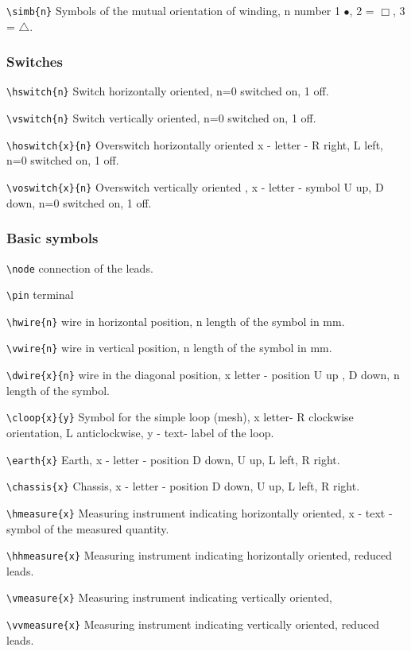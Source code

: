 \noindent
\verb?\simb{n}?
Symbols of the mutual orientation of winding,
n number 1 $\bullet$, 2 = $\Box$, 3 =
$\triangle $.


\subsubsection{Switches}
\verb?\hswitch{n}?
Switch horizontally oriented, n=0 switched on, 1 off.

\noindent
\verb?\vswitch{n}?
Switch vertically oriented, n=0 switched on, 1 off.


\noindent
\verb?\hoswitch{x}{n}?
Overswitch horizontally oriented x - letter - R right,
L left, n=0 switched on, 1 off.

\noindent
\verb?\voswitch{x}{n}?
Overswitch vertically oriented , x - letter - symbol U up,
D down, n=0 switched on, 1 off.

\subsubsection{Basic symbols}
\verb?\node?
connection of the leads.

\noindent
\verb?\pin?
terminal

\noindent
\verb?\hwire{n}?
wire in horizontal position, n length of the symbol in mm.


\noindent
\verb?\vwire{n}?
wire in vertical position, n length of the symbol in mm.

\noindent
\verb?\dwire{x}{n}?
wire in the diagonal position, x letter - position U up , D
down, n  length of the symbol.

\noindent
\verb?\cloop{x}{y}?
Symbol for the simple loop (mesh), x letter- R clockwise orientation,
L anticlockwise, y - text- label of the loop.

\noindent
\verb?\earth{x}?
Earth, x - letter - position D down, U up, L left, R right.


\noindent
\verb?\chassis{x}?
Chassis, x - letter - position D down, U up, L left, R right.


\noindent
\verb?\hmeasure{x}?
Measuring instrument indicating horizontally oriented,
x - text - symbol of the measured quantity.

\noindent
\verb?\hhmeasure{x}?
Measuring instrument indicating horizontally oriented, reduced leads.

\noindent
\verb?\vmeasure{x}?
Measuring instrument indicating vertically oriented,

\noindent
\verb?\vvmeasure{x}?
Measuring instrument indicating vertically oriented, reduced leads.

